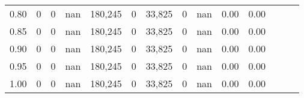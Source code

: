 \begin{tabular}{rrrrrrrrrrrrrr}
0.80 &        0 &       0 &   nan &  180,245 &        0 &  33,825 &       0 &   nan &  0.00 &      0.00 \\
0.85 &        0 &       0 &   nan &  180,245 &        0 &  33,825 &       0 &   nan &  0.00 &      0.00 \\
0.90 &        0 &       0 &   nan &  180,245 &        0 &  33,825 &       0 &   nan &  0.00 &      0.00 \\
0.95 &        0 &       0 &   nan &  180,245 &        0 &  33,825 &       0 &   nan &  0.00 &      0.00 \\
1.00 &        0 &       0 &   nan &  180,245 &        0 &  33,825 &       0 &   nan &  0.00 &      0.00 \\
\bottomrule
\end{tabular}
